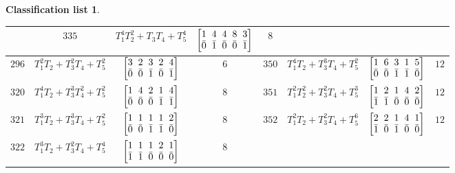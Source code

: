 \documentclass[pdftex]{sigma}%
\theoremstyle{definition}
\newtheorem{class-list}[thm]{Classification list}
\numberwithin{equation}{section}
\begin{document}
\begin{class-list}
\begin{table}[h!]
\begin{tabu}{c|c|c|c||c|c|c|c}
&${335}$&${T_{1}^{4}T_{2}^{2}+T_{3}T_{4}+T_{5}^{4}}$
&$\arraycolsep=1mm\begin{bmatrix}{1} & {4} & {4} & {8} & {3} \\ {\bar{0}} & {\bar{1}} & {\bar{0}} & {\bar{0}} & {\bar{1}}\end{bmatrix}$&${8}$
\\
\hline
${296}$&${T_{1}^{2}T_{2}+T_{3}^{2}T_{4}+T_{5}^{2}}$
&$\arraycolsep=1mm\begin{bmatrix}{3} & {2} & {3} & {2} & {4} \\ {\bar{0}} & {\bar{0}} & {\bar{1}} & {\bar{0}} & {\bar{1}}\end{bmatrix}$&${6}$
&${350}$&${T_{1}^{4}T_{2}+T_{3}^{3}T_{4}+T_{5}^{2}}$
&$\arraycolsep=1mm\begin{bmatrix}{1} & {6} & {3} & {1} & {5} \\ {\bar{0}} & {\bar{0}} & {\bar{1}} & {\bar{1}} & {\bar{0}}\end{bmatrix}$&${12}$
\\
\hline
${320}$&${T_{1}^{4}T_{2}+T_{3}^{3}T_{4}^{2}+T_{5}^{2}}$
&$\arraycolsep=1mm\begin{bmatrix}{1} & {4} & {2} & {1} & {4} \\ {\bar{0}} & {\bar{0}} & {\bar{0}} & {\bar{1}} & {\bar{1}}\end{bmatrix}$&${8}$
&${351}$&${T_{1}^{2}T_{2}^{2}+T_{3}^{2}T_{4}+T_{5}^{3}}$
&$\arraycolsep=1mm\begin{bmatrix}{1} & {2} & {1} & {4} & {2} \\ {\bar{1}} & {\bar{1}} & {\bar{0}} & {\bar{0}} & {\bar{0}}\end{bmatrix}$&${12}$
\\
\hline
${321}$&${T_{1}^{3}T_{2}+T_{3}^{3}T_{4}+T_{5}^{2}}$
&$\arraycolsep=1mm\begin{bmatrix}{1} & {1} & {1} & {1} & {2} \\ {\bar{0}} & {\bar{0}} & {\bar{1}} & {\bar{1}} & {\bar{0}}\end{bmatrix}$&${8}$
&${352}$&${T_{1}^{2}T_{2}+T_{3}^{2}T_{4}+T_{5}^{6}}$
&$\arraycolsep=1mm\begin{bmatrix}{2} & {2} & {1} & {4} & {1} \\ {\bar{1}} & {\bar{0}} & {\bar{1}} & {\bar{0}} & {\bar{0}}\end{bmatrix}$&${12}$
\\
\hline
${322}$&${T_{1}^{3}T_{2}+T_{3}^{2}T_{4}+T_{5}^{4}}$
&$\arraycolsep=1mm\begin{bmatrix}{1} & {1} & {1} & {2} & {1} \\ {\bar{1}} & {\bar{1}} & {\bar{0}} & {\bar{0}} & {\bar{0}}\end{bmatrix}$&${8}$

\end{tabu}
\end{table}
\end{class-list}
\end{document}
